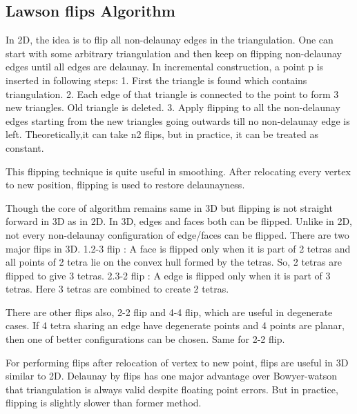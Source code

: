 \subsection{Lawson flips Algorithm}
In 2D, the idea is to flip all non-delaunay edges in the triangulation. One can start with some arbitrary triangulation and then keep on flipping non-delaunay edges until all edges are delaunay. In incremental construction, a point p is inserted in following steps:
1. First the triangle is found which contains triangulation.
2. Each edge of that triangle is connected to the point to form 3 new triangles. Old triangle is deleted.
3. Apply flipping to all the non-delaunay edges starting from the new triangles going outwards till no non-delaunay edge is left. Theoretically,it can take n2 flips, but in practice, it can be treated as constant.

This flipping technique is quite useful in smoothing. After relocating every vertex to new position, flipping is used to restore delaunayness.

Though the core of algorithm remains same in 3D but flipping is not straight forward in 3D as in 2D. In 3D, edges and faces both can be flipped. Unlike in 2D, not every non-delaunay configuration of edge/faces  can be flipped. There are two major flips in 3D. 
1.2-3 flip : A face is flipped only when it is part of 2 tetras and all points of 2 tetra lie on the convex hull formed by the tetras. So, 2 tetras are flipped to give 3 tetras.
2.3-2 flip : A edge is flipped only when it is part of 3 tetras.
Here 3 tetras are combined to create 2 tetras.

There are other flips also, 2-2 flip and 4-4 flip, which are useful in degenerate cases. If 4 tetra sharing an edge have degenerate points and 4 points are planar, then one of better configurations can be chosen. Same for 2-2 flip.

For performing flips after relocation of vertex to new point, flips are useful in 3D similar to 2D. Delaunay by flips has one major advantage over Bowyer-watson that triangulation is always valid despite floating point errors. But in practice, flipping is slightly slower than former method.






